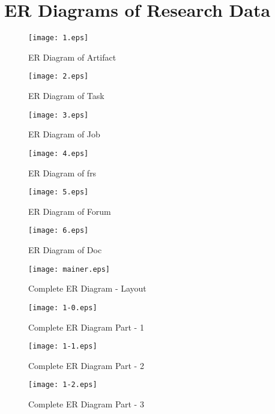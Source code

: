 \chapter{ER Diagrams of Research Data}
\ifpdf
    \graphicspath{{Appendix1/Appendix1Figs/PNG/}{Appendix1/Appendix1Figs/PDF/}{Appendix1/Appendix1Figs/}}
\else
    \graphicspath{{Appendix1/Appendix1Figs/EPS/}{Appendix1/Appendix1Figs/}}
\fi
\begin{figure}
\centering
\caption{ER Diagram of Artifact}
\texttt{[image: 1.eps]}
\end{figure}

\begin{figure}
\centering
\caption{ER Diagram of Task}
\texttt{[image: 2.eps]}
\end{figure}

\begin{figure}
\centering
\caption{ER Diagram of Job}
\texttt{[image: 3.eps]}
\end{figure}

\begin{figure}
\centering
\caption{ER Diagram of frs}
\texttt{[image: 4.eps]}
\end{figure}

\begin{figure}
\centering
\caption{ER Diagram of Forum}
\texttt{[image: 5.eps]}
\end{figure}

\pagebreak

\begin{figure}
\centering
\caption{ER Diagram of Doc}
\texttt{[image: 6.eps]}
\end{figure}

\pagebreak

\begin{figure}
\centering
\caption{Complete ER Diagram - Layout }
\texttt{[image: mainer.eps]}
\end{figure}

\begin{figure}
\centering
\caption{Complete ER Diagram Part - 1}
\texttt{[image: 1-0.eps]}
\end{figure}

\begin{figure}
\centering
\caption{Complete ER Diagram Part - 2}
\texttt{[image: 1-1.eps]}
\end{figure}

\begin{figure}
\centering
\caption{Complete ER Diagram Part - 3}
\texttt{[image: 1-2.eps]}
\end{figure}

